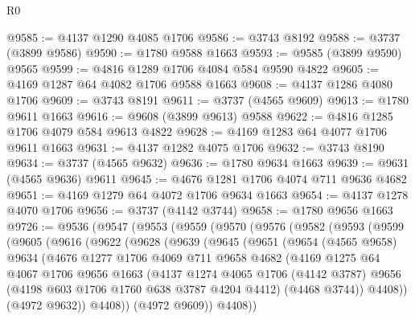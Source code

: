 \begin{lexlean}{R0}
\begin{coremodule}
@9585 := @4137 @1290 @4085 @1706
@9586 := @3743 @8192
@9588 := @3737 (@3899 @9586)
@9590 := @1780 @9588 @1663
@9593 := @9585 (@3899 @9590) @9565
@9599 := @4816 @1289 @1706 @4084 @584 @9590 @4822
@9605 := @4169 @1287 @64 @4082 @1706 @9588 @1663
@9608 := @4137 @1286 @4080 @1706
@9609 := @3743 @8191
@9611 := @3737 (@4565 @9609)
@9613 := @1780 @9611 @1663
@9616 := @9608 (@3899 @9613) @9588
@9622 := @4816 @1285 @1706 @4079 @584 @9613 @4822
@9628 := @4169 @1283 @64 @4077 @1706 @9611 @1663
@9631 := @4137 @1282 @4075 @1706
@9632 := @3743 @8190
@9634 := @3737 (@4565 @9632)
@9636 := @1780 @9634 @1663
@9639 := @9631 (@4565 @9636) @9611
@9645 := @4676 @1281 @1706 @4074 @711 @9636 @4682
@9651 := @4169 @1279 @64 @4072 @1706 @9634 @1663
@9654 := @4137 @1278 @4070 @1706
@9656 := @3737 (@4142 @3744)
@9658 := @1780 @9656 @1663
@9726 := @9536
    (@9547
      (@9553
        (@9559
          (@9570
            (@9576
              (@9582
                (@9593
                  (@9599
                    (@9605
                      (@9616
                        (@9622
                          (@9628
                            (@9639
                              (@9645
                                (@9651
                                  (@9654
                                    (@4565 @9658)
                                    @9634
                                    (@4676
                                      @1277
                                      @1706
                                      @4069
                                      @711
                                      @9658
                                      @4682
                                      (@4169
                                        @1275
                                        @64
                                        @4067
                                        @1706
                                        @9656
                                        @1663
                                        (@4137
                                          @1274
                                          @4065
                                          @1706
                                          (@4142 @3787)
                                          @9656
                                          (@4198 @603 @1706 @1760 @638 @3787 @4204 @4412)
                                          (@4468 @3744))
                                        @4408))
                                    (@4972 @9632))
                                  @4408))
                              (@4972 @9609))
                            @4408))

\end{coremodule}
\end{lexlean}
